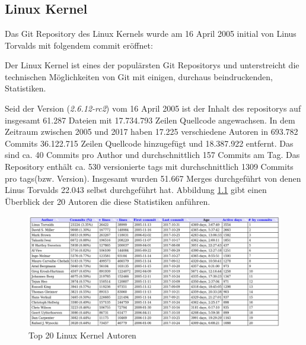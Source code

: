 \chapter{\lookout}
\label{cha:lookout}
\section{Linux Kernel}\label{sec:kernel}
Das Git Repository des Linux Kernels wurde am 16 April 2005 initial von Linus
Torvalds mit folgendem \gls{commit}\cite{link:linuxgit} eröffnet:



Der Linux Kernel ist eines der populärsten Git Repositorys und unterstreicht
die technischen Möglichkeiten von Git mit einigen, durchaus beindruckenden,
Statistiken.

Seid der Version (\textit{2.6.12-rc2}) vom 16 April 2005 ist der Inhalt des
\glspl{repository} auf insgesamt 61.287 Dateien mit 17.734.793 Zeilen Quellcode
angewachsen. In dem Zeitraum zwischen 2005 und 2017 haben 17.225 verschiedene
Autoren in 693.782 Commits 36.122.715 Zeilen Quellcode hinzugefügt und
18.387.922 entfernt. Das sind ca. 40 Commits pro Author und durchschnittlich
157 Commits am Tag. Das Repository enthält ca. 530 versionierte \glspl{tag}
mit durchschnittlich 1309 Commits pro \glspl{tag}(bzw. Version). Insgesamt wurden
51.667 Merges durchgeführt von denen Linus Torvalds 22.043 selbst durchgeführt
hat. Abbildung \ref{top20} gibt einen Überblick der 20 Autoren die diese
Statistiken anführen.

\begin{figure}
	\centering
  \includegraphics[scale=0.40]{images/top_20_of_linux_authors.png}
	\caption{Top 20 Linux Kernel Autoren}
	\label{top20}
\end{figure}

